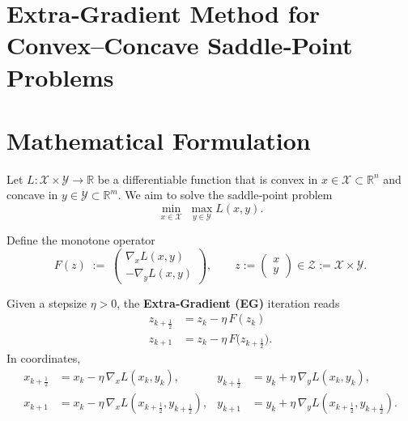 \documentclass{article}
\newcommand{\R}{\mathbb{R}}
\begin{document}
\section*{Extra‑Gradient Method for Convex–Concave Saddle‑Point Problems}

\section*{Mathematical Formulation}
Let $L:\mathcal{X}\times\mathcal{Y}\rightarrow\R$ be a differentiable function that is convex in $x\in\mathcal{X}\subset\R^{n}$ and concave in $y\in\mathcal{Y}\subset\R^{m}$.  
We aim to solve the saddle‑point problem
\[
\min_{x\in\mathcal{X}}\;\max_{y\in\mathcal{Y}} L(x,y).
\]

Define the monotone operator
\[
F(z)\;:=\;\begin{pmatrix}
\nabla_{x}L(x,y)\\[2mm]
-\nabla_{y}L(x,y)
\end{pmatrix},\qquad 
z:=\begin{pmatrix}x\\ y\end{pmatrix}\in\mathcal{Z}:=\mathcal{X}\times\mathcal{Y}.
\]

Given a stepsize $\eta>0$, the \textbf{Extra‑Gradient (EG)} iteration reads
\begin{align}
z_{k+\frac12}&=z_{k}-\eta\,F(z_{k})\label{eq:mid}\\
z_{k+1}&=z_{k}-\eta\,F\!\bigl(z_{k+\frac12}\bigr).\label{eq:update}
\end{align}
In coordinates,
\[
\begin{aligned}
x_{k+\frac12}&=x_{k}-\eta\,\nabla_{x}L(x_{k},y_{k}), &
y_{k+\frac12}&=y_{k}+\eta\,\nabla_{y}L(x_{k},y_{k}),\\[1mm]
x_{k+1}&=x_{k}-\eta\,\nabla_{x}L(x_{k+\frac12},y_{k+\frac12}), &
y_{k+1}&=y_{k}+\eta\,\nabla_{y}L(x_{k+\frac12},y_{k+\frac12}).
\end{aligned}
\]
\end{document}

